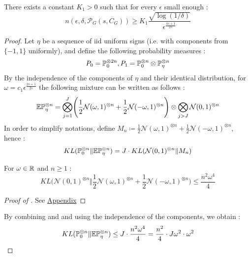 \begin{prop}\label{nonparam}\cite{gerberclas}
    There exists a constant $K_1 >0$ such that for every $\epsilon$ small enough : 
    \begin{equation}\label{nonparameq}
        n(\epsilon,\delta,\mathcal{P}_G(s,C_G)) \geq K_1 \frac{\sqrt{\log(1/\delta)}}{\epsilon^{\frac{4s+1}{2s}}}
    \end{equation}
\end{prop}
\begin{proof}
    Let $\eta$ be a sequence of iid uniform signs (i.e. with components from $\{-1,1\}$ uniformly), and define the following probability measures : 
    \begin{equation*}
    P_0 = \P_0^{\otimes 2n},P_1 = \P_0^{\otimes n}\otimes \P_\eta^{\otimes n}
    \end{equation*} 
    By the independence of the components of $\eta$ and their identical distribution, for $\omega=c_1 \epsilon^{\frac{2s+1}{2s}}$ the following mixture can be written as follows : 
    \begin{equation*}
        \E\P_\eta^{\otimes n} = \bigotimes_{j=1}^J \Biggl(\frac{1}{2}\mathcal{N}(\omega,1)^{\otimes n}+\frac{1}{2}\mathcal{N}(-\omega,1)^{\otimes n}\Biggr) \otimes \bigotimes_{j>J}\mathcal{N}(0,1)^{\otimes n}
    \end{equation*}
    In order to simplify notations, define $M_n \coloneqq\frac{1}{2}\mathcal{N}(\omega,1)^{\otimes n}+\frac{1}{2}\mathcal{N}(-\omega,1)^{\otimes n}$, hence : 
    \begin{equation}\label{mixture}
        KL(\P_0^{\otimes n} \Vert \E\P_\eta^{\otimes n}) = J\cdot KL(\mathcal{N}(0,1)^{\otimes n}\Vert M_n)
    \end{equation}
\begin{lemma}\label{klmixture}
    For $\omega \in \R$ and $n \geq 1$ : 
    \begin{equation}
        KL\Biggl(\mathcal{N}(0,1)^{\otimes n}\bigg\Vert \frac{1}{2}\mathcal{N}(\omega,1)^{\otimes n} +\frac{1}{2}\mathcal{N}(-\omega,1)^{\otimes n} \Biggr) \leq \frac{n^2\omega^4}{4}
    \end{equation}
\end{lemma}
\begin{proof}[Proof of ]
    See \hyperref[appendix]{Appendix}
\end{proof}
By combining  and  and using the independence of the components, we obtain : 
\begin{equation*}
    KL(\P_0^{\otimes n}\Vert \E\P_\eta^{\otimes n}) \leq J\cdot \frac{n^2\omega^4}{4} = \frac{n^2}{4}\cdot J\omega^2 \cdot \omega^2

\end{equation*}
\end{proof}
